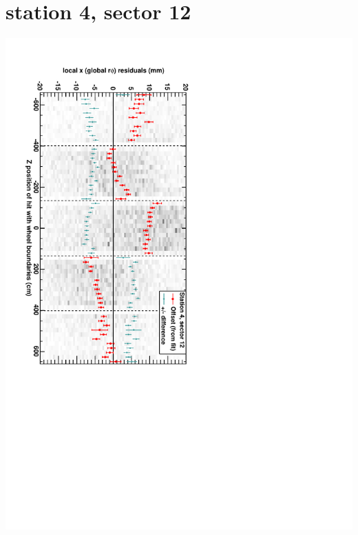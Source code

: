 \documentclass[compress]{beamer}
\begin{document}
\section*{station 4, sector 12}
\begin{frame} \vfill \mbox{\hspace{-1 cm}\includegraphics[height=1.2\linewidth, angle=90]{DTrphiVsZ_st4_sr12.pdf}} \end{frame}
\end{document}
